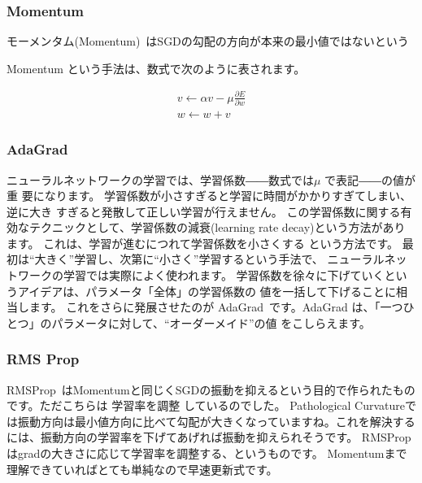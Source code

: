 \subsubsection{Momentum}

モーメンタム(Momentum)~\cite{momentum}はSGDの勾配の方向が本来の最小値ではないという


Momentum という手法は、数式で次のように表されます。

\begin{eqnarray}
    v \leftarrow \alpha v - \mu \frac {\partial E }{\partial w} \\
    w \leftarrow w+v
\label{eq:norm uneq}
\end{eqnarray}



\subsubsection{AdaGrad}
ニューラルネットワークの学習では、学習係数――数式では$ \mu $ で表記――の値が重 要になります。
学習係数が小さすぎると学習に時間がかかりすぎてしまい、逆に大き すぎると発散して正しい学習が行えません。
この学習係数に関する有効なテクニックとして、学習係数の減衰(learning rate decay)という方法があります。
これは、学習が進むにつれて学習係数を小さくする という方法です。
最初は“大きく”学習し、次第に“小さく”学習するという手法で、 ニューラルネットワークの学習では実際によく使われます。
学習係数を徐々に下げていくというアイデアは、パラメータ「全体」の学習係数の 値を一括して下げることに相当します。
これをさらに発展させたのが AdaGrad~\cite{momentum}です。AdaGrad は、「一つひとつ」のパラメータに対して、“オーダーメイド”の値 をこしらえます。


\subsubsection{RMS Prop}
RMSProp~\cite{rms_prop}はMomentumと同じくSGDの振動を抑えるという目的で作られたものです。ただこちらは 学習率を調整 しているのでした。
Pathological Curvatureでは振動方向は最小値方向に比べて勾配が大きくなっていますね。これを解決するには、振動方向の学習率を下げてあげれば振動を抑えられそうです。
RMSPropはgradの大きさに応じて学習率を調整する、というものです。
Momentumまで理解できていればとても単純なので早速更新式です。


